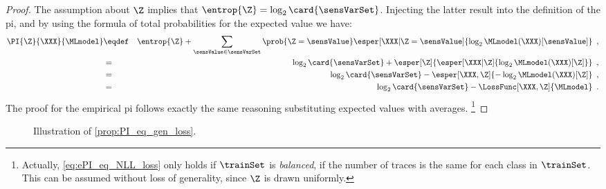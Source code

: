 \begin{proof}
    The assumption about \(\Z\) implies that \(\entrop{\Z} = \log_2{\card{\sensVarSet}}\).
    Injecting the latter result into the definition of the \gls{pi}, and by using the formula of total probabilities for the expected value we have:
    \begin{eqnarray*}
        \PI{\Z}{\XXX}{\MLmodel} & \eqdef & \entrop{\Z} +
        \sum_{\sensValue \in \sensVarSet} \prob{\Z = \sensValue}
        \esper[\XXX | \Z = \sensValue]{\log_2 \MLmodel(\XXX)[\sensValue]} \enspace , \\
        & = & \log_2{\card{\sensVarSet}} + \esper[\Z]{\esper[\XXX | \Z]{\log_2\MLmodel(\XXX)[\Z]}} \enspace , \\
        & = & \log_2{\card{\sensVarSet}} - \esper[\XXX,\Z]{-\log_2\MLmodel(\XXX)[\Z]} \enspace ,\\
        & = & \log_2{\card{\sensVarSet}} - \LossFunc[\XXX, \Z]{\MLmodel} \enspace .
    \end{eqnarray*}
    The proof for the empirical \gls{pi} follows exactly the same reasoning substituting expected values with averages.%
    \footnote{Actually, \autoref{eq:ePI_eq_NLL_loss} only holds if \(\trainSet\) is \emph{balanced}, \ie{} if the number of traces is the same for each class in \(\trainSet\). 
    This can be assumed without loss of generality, since \(\Z\) is drawn uniformly.}
\end{proof}

\begin{figure}
    \centering
    
    \caption{Illustration of \autoref{prop:PI_eq_gen_loss}.}
    \label{fig:illustration_prop}
\end{figure}

